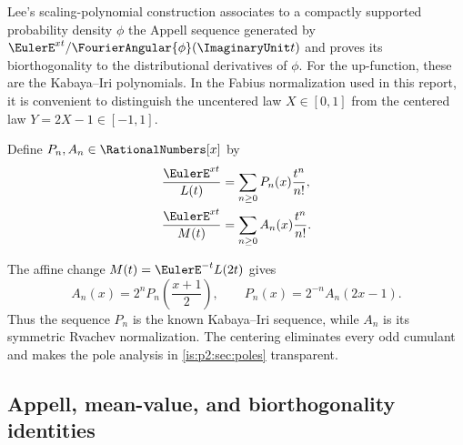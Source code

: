 Lee's scaling-polynomial construction associates to a compactly supported probability density
$\phi$ the Appell sequence generated by
$\EulerE^{xt}/\FourierAngular{\phi}(\ImaginaryUnit t)$ and proves its biorthogonality
to the distributional derivatives of $\phi$.  For the up-function, these are the Kabaya--Iri
polynomials.  In the Fabius normalization used in this report, it is convenient to distinguish the
uncentered law $X\in[0,1]$ from the centered law $Y=2X-1\in[-1,1]$.

\begin{definition}
\label{is:p2:def:Appell-polys}
Define $P_n,A_n\in\RationalNumbers[x]$ by
\begin{align}
 \frac{\EulerE^{xt}}{L(t)}
 &=\sum_{n\ge0}P_n(x)\frac{t^n}{n!},
 \label{is:p2:eq:P-generating}\\
 \frac{\EulerE^{xt}}{M(t)}
 &=\sum_{n\ge0}A_n(x)\frac{t^n}{n!}.
 \label{is:p2:eq:A-generating}
\end{align}
\end{definition}

The affine change $M(t)=\EulerE^{-t}L(2t)$ gives
\begin{equation}
 \boxed{
 A_n(x)=2^nP_n\!\left(\frac{x+1}{2}\right),
 \qquad
 P_n(x)=2^{-n}A_n(2x-1).
 }
 \label{is:p2:eq:A-P-affine}
\end{equation}
Thus the sequence $P_n$ is the known Kabaya--Iri sequence, while $A_n$ is its symmetric Rvachev
normalization.  The centering eliminates every odd cumulant and makes the pole analysis in
\cref{is:p2:sec:poles} transparent.

\subsection{Appell, mean-value, and biorthogonality identities}


